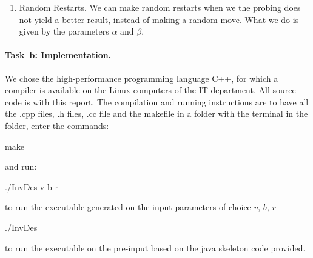 \begin{enumerate}
\item Random Restarts. We can make random restarts when we the probing does not yield a better result, instead of making a random move. What we do is given by the parameters $\alpha$ and $\beta$. 
\end{enumerate}

\paragraph{Task~b: Implementation.}
We chose the high-performance programming language C++, for
which a compiler is available on the Linux
computers of the IT department.  All source code is 
with this report.  The compilation and running instructions are
to have all the \textsf{.cpp} files, \textsf{.h} files, \textsf{.cc} file and the makefile in a folder with the terminal in the folder, enter the commands:
\begin{center}
\textsf{make}
\end{center}
and run:
\begin{center}
\textsf{./InvDes {v} {b} {r} }
\end{center}
to run the executable generated on the input parameters of choice $v$,  $b$,  $r$
\begin{center}
\textsf{./InvDes}
\end{center}
to run the executable on the pre-input based on the java skeleton code provided. 


